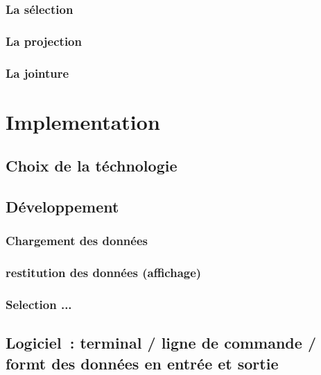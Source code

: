 \documentclass[oneside,13pt,a4paper]{report}
\begin{document}
            \subsection{La sélection}

            \subsection{La projection}

            \subsection{La jointure}


    \chapter{Implementation}

        \section{Choix de la téchnologie}

        \section{Développement}

            \subsection{Chargement des données}

            \subsection{restitution des données (affichage)}

            \subsection{Selection ...}

        \section{Logiciel : terminal / ligne de commande / formt des données en entrée et sortie}
\end{document}
